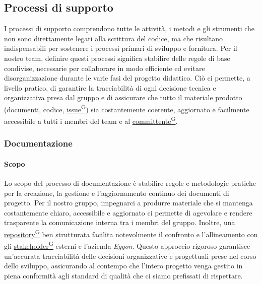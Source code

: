 \documentclass[a4paper,12pt]{article}
\providecommand{\glslink}[2]{\href{https://alittlebyte-19.github.io/Documentazione/glossario.html\#gls-#1}{\underline{#2}\textsuperscript{\scriptsize G}}}
\begin{document}
\subsection{Processi di supporto}
I processi di supporto comprendono tutte le attività, i metodi e gli strumenti che non sono direttamente legati alla scrittura del codice, ma che risultano indispensabili per sostenere i processi primari di sviluppo e fornitura. Per il nostro team, definire questi processi significa stabilire delle regole di base condivise, necessarie per collaborare in modo efficiente ed evitare disorganizzazione durante le varie fasi del progetto didattico. Ciò ci permette, a livello pratico, di garantire la tracciabilità di ogni decisione tecnica e organizzativa presa dal gruppo e di assicurare che tutto il materiale prodotto (documenti, codice, \glslink{issue}{issue}) sia costantemente coerente, aggiornato e facilmente accessibile a tutti i membri del team e al \glslink{committente-proponente}{committente}.

\subsubsection{Documentazione}

\paragraph{Scopo}
Lo scopo del processo di documentazione è stabilire regole e metodologie pratiche per la creazione, la gestione e l'aggiornamento continuo dei documenti di progetto. Per il nostro gruppo, impegnarci a produrre materiale che si mantenga costantemente chiaro, accessibile e aggiornato ci permette di agevolare e rendere trasparente la comunicazione interna tra i membri del gruppo. Inoltre, una \glslink{repository}{repository} ben strutturata facilita notevolmente il confronto e l'allineamento con gli \glslink{stakeholder}{stakeholder} esterni e l'azienda \textit{Eggon}. Questo approccio rigoroso garantisce un'accurata tracciabilità delle decisioni organizzative e progettuali prese nel corso dello sviluppo, assicurando al contempo che l'intero progetto venga gestito in piena conformità agli standard di qualità che ci siamo prefissati di rispettare.
\end{document}

